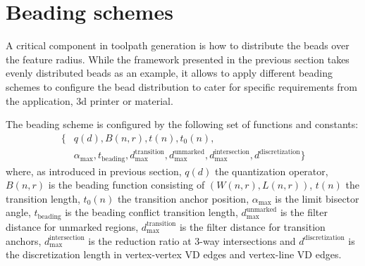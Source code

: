\section{Beading schemes}\label{sec_generalization}
A critical component in toolpath generation is how to distribute the beads over the feature radius.
While the framework presented in the previous section takes evenly distributed beads as an example, it allows to apply different beading schemes to configure the bead distribution to cater for specific requirements from the application, 3d printer or material.



\begin{definition}\label{beading_scheme_definition}
The beading scheme is configured by the following set of functions and constants:
\begin{align*}
\{
&q(d),
B(n, r),
t(n),
t_0(n),
\\
&\alpha_\text{max}, 
t_\text{beading}, 
d_\text{max}^\text{transition}, 
d_\text{max}^\text{unmarked}, 
d_\text{max}^\text{intersection},
d^\text{discretization}
 \}
\end{align*}
where, as introduced in previous section,
$q(d)$ the quantization operator,
$B(n,r)$ is the beading function consisting of $\left( W(n,r), L(n,r) \right)$,
$t(n)$ the transition length,
$t_0(n)$ the transition anchor position,
$\alpha_{\text{max}}$ is the limit bisector angle,
$t_\text{beading}$ is the beading conflict transition length,
$d_\text{max}^\text{unmarked}$ is the filter distance for unmarked regions,
$d_\text{max}^\text{transition}$ is the filter distance for transition anchors,
$d_\text{max}^\text{intersection}$ is the reduction ratio at 3-way intersections
and
$d^\text{discretization}$ is the discretization length in vertex-vertex VD edges and vertex-line VD edges.
\end{definition}



